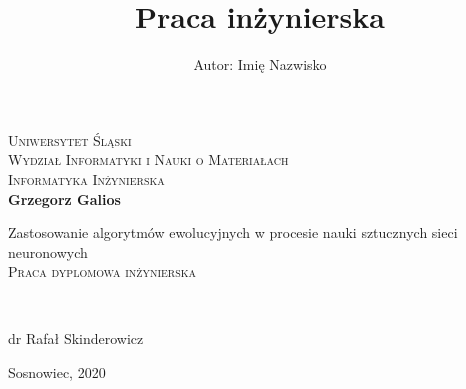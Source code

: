 
\newpage
\thispagestyle{empty}





\begin{onehalfspacing}
\begin{center}

\centering


\title{Praca inżynierska}
\author{Autor: Imię Nazwisko}


{\fontsize{17}{17}}\selectfont
\textsc{Uniwersytet Śląski \\[.3cm]
Wydział Informatyki i Nauki o Materiałach  \\[.3cm]
Informatyka Inżynierska  \\[2.5cm]}
\textbf{Grzegorz Galios \\[.3cm]}




\large 
{Zastosowanie algorytmów ewolucyjnych w procesie nauki sztucznych sieci neuronowych} \\[.5cm]
\textsc{Praca dyplomowa inżynierska}
\end{center} ~\\[3cm]

\large
\begin{flushright}
dr Rafał Skinderowicz \\
\end{flushright}

\begin{bottompar}
\begin{flushright}
Sosnowiec, 2020
\end{flushright}
\end{bottompar}
\end{onehalfspacing}






\setcounter{page}{0} \pagestyle{plain}

\pagestyle{fancy}
